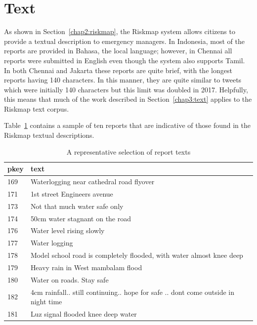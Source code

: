 \section{Text}
As shown in Section~\ref{chap2:riskmap}, the Riskmap system allows citizens to provide
a textual description to emergency managers. In Indonesia, most of the reports
are provided in Bahasa, the local language; however, in Chennai all reports were
submitted in English even though the system also supports Tamil. In both Chennai
and Jakarta these reports are quite brief, with the longest reports having 140
characters. In this manner, they are quite similar to tweets which were
initially 140 characters but this limit was doubled in 2017. Helpfully, this
means that much of the work described in Section~\ref{chap3:text} applies to the Riskmap
text corpus.

Table~\ref{table:text_sample} contains a sample of ten reports that are
indicative of those found in the Riskmap textual descriptions.

\begin{table}
\centering
  \begin{tabular}{ll}
    \toprule
    pkey & text \\ 
    \hline
    \midrule
    169  &
    Waterlogging near cathedral road flyover  \\
    171  &
    1st street Engineers avenue \\
    173  &
    Not that much water safe only \\
    174  &
    50cm water stagnant on the road \\
    176  &
    Water level rising  slowly  \\
    177  &
    Water logging  \\
    178  &
    Model school road is completely flooded, with water almost knee deep \\
    179  &
    Heavy rain in West mambalam flood \\
    180  &
    Water on roads. Stay safe \\
    182  &                                                           4cm
    rainfall.. still continuing.. hope for safe .. dont come outside in
    night time \\
    181  &
    Luz signal flooded knee deep water \\
    \bottomrule
  \end{tabular}
  \caption{A representative selection of report texts}\label{table:text_sample}
\end{table}


